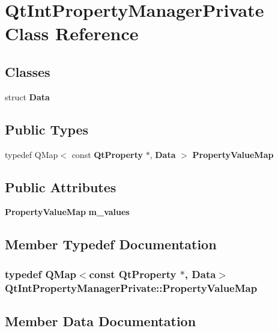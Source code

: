 \section{Qt\+Int\+Property\+Manager\+Private Class Reference}
\label{classQtIntPropertyManagerPrivate}
\subsection*{Classes}
\begin{DoxyCompactItemize}
\item 
struct {\bf Data}
\end{DoxyCompactItemize}
\subsection*{Public Types}
\begin{DoxyCompactItemize}
\item 
typedef Q\+Map$<$ const {\bf Qt\+Property} $\ast$, {\bf Data} $>$ {\bf Property\+Value\+Map}
\end{DoxyCompactItemize}
\subsection*{Public Attributes}
\begin{DoxyCompactItemize}
\item 
{\bf Property\+Value\+Map} {\bf m\+\_\+values}
\end{DoxyCompactItemize}


\subsection{Member Typedef Documentation}
\subsubsection[{Property\+Value\+Map}]{\setlength{\rightskip}{0pt plus 5cm}typedef Q\+Map$<$const {\bf Qt\+Property} $\ast$, {\bf Data}$>$ {\bf Qt\+Int\+Property\+Manager\+Private\+::\+Property\+Value\+Map}}\label{classQtIntPropertyManagerPrivate_a1bc62996969118c676b3a2d35e47fb0c}


\subsection{Member Data Documentation}
